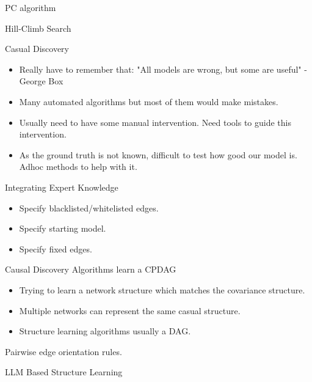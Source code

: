 \documentclass{beamer}
\begin{document}
\begin{frame}{PC algorithm}

\end{frame}

\begin{frame}{Hill-Climb Search}
\end{frame}

\begin{frame}{Casual Discovery}
	\begin{itemize}
		\item Really have to remember that: "All models are wrong, but some are useful" - George Box
		\item Many automated algorithms but most of them would make mistakes.
		\item Usually need to have some manual intervention. Need tools to guide this intervention.
		\item As the ground truth is not known, difficult to test how good our model is. Adhoc methods to help with it.
	\end{itemize}
\end{frame}

\begin{frame}{Integrating Expert Knowledge}
	\begin{itemize}
		\item Specify blacklisted/whitelisted edges.
		\item Specify starting model.
		\item Specify fixed edges.
	\end{itemize}
\end{frame}

\begin{frame}{Causal Discovery Algorithms learn a CPDAG}
	\begin{itemize}
		\item Trying to learn a network structure which matches the covariance
			structure.
		\item Multiple networks can represent the same casual structure.
		\item Structure learning algorithms usually a DAG.
	\end{itemize}

	Pairwise edge orientation rules.
\end{frame}

\begin{frame}
\end{frame}

\begin{frame}{LLM Based Structure Learning}
\end{frame}
\end{document}
